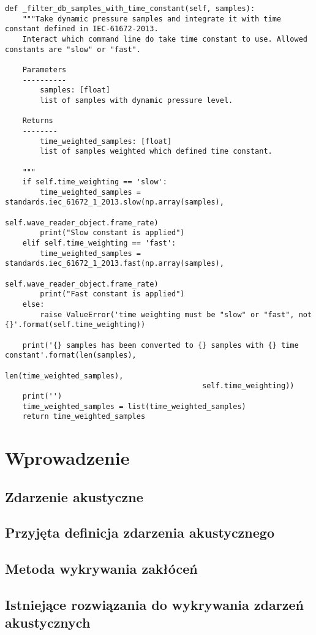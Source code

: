\documentclass[eng,printmode]{mgr}
\begin{document}
\begin{lstlisting}[frame=single]
def _filter_db_samples_with_time_constant(self, samples):
    """Take dynamic pressure samples and integrate it with time constant defined in IEC-61672-2013.
    Interact which command line do take time constant to use. Allowed constants are "slow" or "fast".

    Parameters
    ----------
        samples: [float]
        list of samples with dynamic pressure level.

    Returns
    --------
        time_weighted_samples: [float]
        list of samples weighted which defined time constant.

    """
    if self.time_weighting == 'slow':
        time_weighted_samples = standards.iec_61672_1_2013.slow(np.array(samples),
                                    self.wave_reader_object.frame_rate)
        print("Slow constant is applied")
    elif self.time_weighting == 'fast':
        time_weighted_samples = standards.iec_61672_1_2013.fast(np.array(samples),
                                    self.wave_reader_object.frame_rate)
        print("Fast constant is applied")
    else:
        raise ValueError('time weighting must be "slow" or "fast", not {}'.format(self.time_weighting))

    print('{} samples has been converted to {} samples with {} time constant'.format(len(samples),
                                             len(time_weighted_samples),
                                             self.time_weighting))
    print('')
    time_weighted_samples = list(time_weighted_samples)
    return time_weighted_samples

\end{lstlisting}

\chapter{Wprowadzenie}
\section{Zdarzenie akustyczne}
\section{Przyjęta definicja zdarzenia akustycznego}
\section{Metoda wykrywania zakłóceń}
\section{Istniejące rozwiązania do wykrywania zdarzeń akustycznych}
\end{document}
